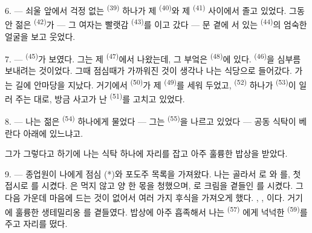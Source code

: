 \VUsaut{4.0mm}
\VUsaut{3.0mm}

6. --- 쇠울 앞에서 걱정 없는  \textsuperscript{(39)} 하나가 제
 \textsuperscript{(40)}와 제  \textsuperscript{(41)}
사이에서 졸고 있었다. 그동안 젊은  \textsuperscript{(42)}가 — 그
여자는 빨랫감  \textsuperscript{(43)}를 이고 갔다 — 문 곁에 서 있는
 \textsuperscript{(44)}의 엄숙한 얼굴을 보고 웃었다.

7. ---  \textsuperscript{(45)}가 보였다. 그는 제 
\textsuperscript{(47)}에서 나왔는데, 그 부엌은  \textsuperscript{(48)}에
있다.  \textsuperscript{(46)}을 심부름 보내려는 것이었다. 그때 점심때가
가까워진 것이 생각나 나는 식당으로 들어갔다. 가는 길에 안마당을 지났다. 거기에서
 \textsuperscript{(50)}가 제  \textsuperscript{(49)}를
세워 두었고,  \textsuperscript{(52)} 하나가 
\textsuperscript{(53)}이 일러 주는 대로, 방금 사고가 난 
\textsuperscript{(51)}를 고치고 있었다.

8. --- 나는 젊은  \textsuperscript{(54)} 하나에게 물었다 — 그는
 \textsuperscript{(55)}을 나르고 있었다 — 공동 식탁이 베란다 아래에 있느냐고.

그가 그렇다고 하기에 나는 식탁 하나에 자리를 잡고 아주 훌륭한 밥상을 받았다.


\VUsaut{4.0mm}
\VUsaut{3.0mm}

9. --- 종업원이 나에게 점심  (*)와 포도주 목록을 가져왔다. 나는 골라서
로 와 를, 첫 접시로 를
시켰다. 은 먹지 않고 양  한 몫을 청했으며,
로 크림을 곁들인 를 시켰다. 그 다음
 가운데 마음에 드는 것이 없어서 여러 가지 후식을 가져오게 했다.
, , 이다. 거기에 훌륭한 생테밀리옹
를 곁들였다. 밥상에 아주 흡족해서 나는  \textsuperscript{(57)}
에게 넉넉한  \textsuperscript{(59)}를 주고 자리를 떴다.

